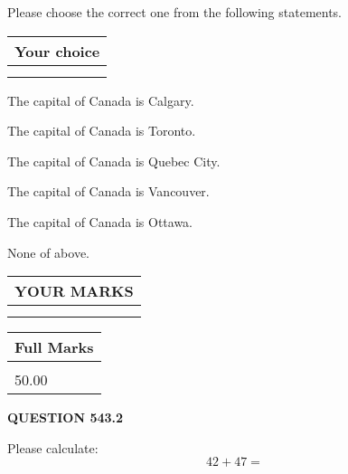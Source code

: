 \documentclass[12pt]{article}
\begin{document}
  
Please choose the correct one from the following statements.
  
  
\noindent\hspace{3.0in} \begin{tabular}{|l|}
\hline
Your choice \\
\hline
 \\ 
 \\ 
\hline
\end{tabular}
  
  
 
 
The capital of Canada is Calgary.
 
 
The capital of Canada is Toronto.
 
 
The capital of Canada is Quebec City.
 
 
The capital of Canada is Vancouver.
 
 
The capital of Canada is Ottawa.
 
 
 None of above.
 
 
  
\vspace{0.2in}
  
\noindent\begin{tabular}{|l|}
\hline
 YOUR MARKS  \\
\hline
 \\ 
 \\ 
\hline
\end{tabular}
\hspace{0.05in} \begin{tabular}{|l|}
\hline
 Full Marks  \\
\hline
 \\ 
50.00 \\
\hline
\end{tabular}
{\textbf{\Large{QUESTION
543.2 
}}}
  
  
 
Please calculate:
\begin{equation}
42 +  %
47 = \nonumber
\end{equation}
 

 

 
   
   
 \vspace{0.2in}
 
   
   
   
   
\end{document}
